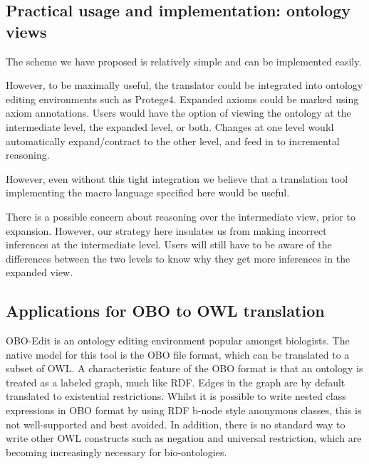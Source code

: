 \documentclass{llncs}
\begin{document}
\subsection{Practical usage and implementation: ontology views}

The scheme we have proposed is relatively simple and can be
implemented easily.

However, to be maximally useful, the translator could be integrated
into ontology editing environments such as Protege4\cite{P4}. Expanded
axioms could be marked using axiom annotations. Users would have the
option of viewing the ontology at the intermediate level, the expanded
level, or both. Changes at one level would automatically
expand/contract to the other level, and feed in to incremental
reasoning.

However, even without this tight integration we believe that a
translation tool implementing the macro language specified here would
be useful.

There is a possible concern about reasoning over the intermediate
view, prior to expansion. However, our strategy here insulates us from
making incorrect inferences at the intermediate level. Users will
still have to be aware of the differences between the two levels to
know why they get more inferences in the expanded view.


\subsection{Applications for OBO to OWL translation}

OBO-Edit is an ontology editing environment popular amongst
biologists\cite{Day-Richter2007}. The native model for this tool is
the OBO file format, which can be translated to a subset of
OWL\cite{golbreich2007obo}\cite{tirmizi2009}. A characteristic feature
of the OBO format is that an ontology is treated as a labeled graph,
much like RDF. Edges in the graph are by default translated to
existential restrictions. Whilst it is possible to write nested class
expressions in OBO format by using RDF b-node style anonymous classes,
this is not well-supported and best avoided. In addition, there is no
standard way to write other OWL constructs such as negation and
universal restriction, which are becoming increasingly necessary for
bio-ontologies.
\end{document}
